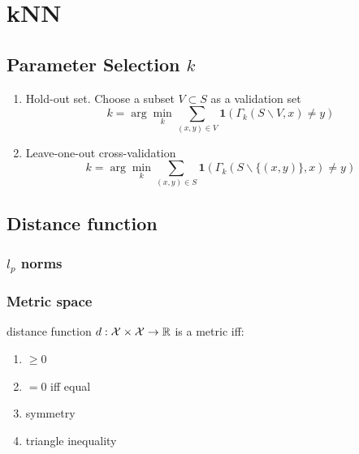 \documentclass[a4paper]{report}
\begin{document}
\section{kNN}
\subsection{Parameter Selection $k$}
\begin{enumerate}
\item Hold-out set. Choose a subset $V\subset S$ as a validation set 
$$
k = \arg\min_k \sum_{(x, y)\in V} \textbf{1}(\Gamma_k(S\backslash V, x)\neq y)
$$
\item Leave-one-out cross-validation 
$$
k = \arg\min_k \sum_{(x, y)\in S} \textbf{1}(\Gamma_k(S\backslash\{(x, y)\}, x)\neq y)
$$
\end{enumerate}
\subsection{Distance function}
\subsubsection{$l_p$ norms}

\subsubsection{Metric space} 
distance function $d: \mathcal{X}\times\mathcal{X}\rightarrow \mathbb{R}$ is a metric iff:
\begin{enumerate}
\item $\geq0$
\item $=0$ iff equal
\item symmetry
\item triangle inequality
\end{enumerate}
\end{document}
